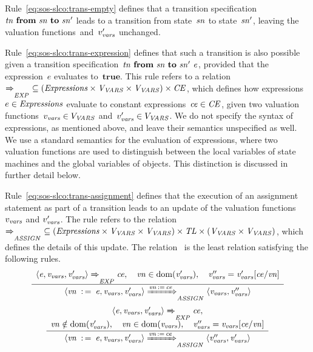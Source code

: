Rule~\eqref{eq:sos-slco:trans-empty} defines that a transition specification~$\it{tn}~\textbf{from}~\it{sn}~\textbf{to}~\it{sn'}$ leads to a transition from state~$\it{sn}$ to state~$\it{sn'}$, leaving the valuation functions~\vvars and~$v_{\it{vars}}'$ unchanged.

Rule~\eqref{eq:sos-slco:trans-expression} defines that such a transition is also possible given a transition specification~$\it{tn}~\textbf{from}~\it{sn}~\textbf{to}~\it{sn'}~\it{e}$, provided that the expression~$e$ evaluates to~$\textbf{true}$.
This rule refers to a relation~$\xRightarrow{\it{}}_{\it{EXP}} ~ \subseteq (\it Expressions \times V_{\it{VARS}} \times V_{\it{VARS}}) \times \it CE$, which defines how expressions~$e \in \it Expressions$ evaluate to constant expressions~$\it{ce} \in \it CE$, given two valuation functions~$v_{\it{vars}} \in V_{\it{VARS}}$ and~$v_{\it{vars}}' \in V_{\it{VARS}}$.
We do not specify the syntax of expressions, as mentioned above, and leave their semantics unspecified as well.
We use a standard semantics for the evaluation of expressions, where two valuation functions are used to distinguish between the local variables of state machines and the global variables of objects.
This distinction is discussed in further detail below.

Rule~\eqref{eq:sos-slco:trans-assignment} defines that the execution of an assignment statement as part of a transition leads to an update of the valuation functions~$v_{\it{vars}}$ and $v_{\it{vars}}'$.
The rule refers to the relation~$\xRightarrow{\it{}}_{\it{ASSIGN}} ~ \subseteq (\it Expressions \times V_{\it{VARS}} \times V_{\it{VARS}}) \times \it TL \times (V_{\it{VARS}} \times V_{\it{VARS}})$, which defines the details of this update.
The relation~\AssignmentRelation{} is the least relation satisfying the following rules.
%
\begin{equation*}
 \frac{ \begin{array}[c]{c} 
\langle \it{e}, v_{\it{vars}}, v_{\it{vars}}' \rangle
\xRightarrow{\it{}}_{\it{EXP}}
\it{ce}, \quad
\it{vn} \in \operatorname{dom}(v_{\it{vars}}'), \quad
v_{\it{vars}}'' = v_{\it{vars}}'[\it{ce}/\it{vn}]
 \end{array} }{ \begin{array}[c]{c} 
\langle \it{vn}~\operatorname*{:=}~\it{e}, v_{\it{vars}}, v_{\it{vars}}' \rangle
\xRightarrow{\it{\it{vn} \operatorname*{:=}\it{ce}}}_{\it{ASSIGN}}
\langle v_{\it{vars}}, v_{\it{vars}}'' \rangle
 \end{array} } 
\end{equation*}
%
\begin{equation*}
 \frac{ \begin{array}[c]{c} 
\langle \it{e}, v_{\it{vars}}, v_{\it{vars}}' \rangle
\xRightarrow{\it{}}_{\it{EXP}}
\it{ce}, \\
\it{vn} \notin \operatorname{dom}(v_{\it{vars}}'), \quad
\it{vn} \in \operatorname{dom}(v_{\it{vars}}), \quad
v_{\it{vars}}'' = v_{\it{vars}}[\it{ce}/\it{vn}]
 \end{array} }{ \begin{array}[c]{c} 
\langle \it{vn}~\operatorname*{:=}~\it{e}, v_{\it{vars}}, v_{\it{vars}}' \rangle
\xRightarrow{\it{\it{vn} \operatorname*{:=}\it{ce}}}_{\it{ASSIGN}}
\langle v_{\it{vars}}'', v_{\it{vars}}' \rangle
 \end{array} } 
\end{equation*}

